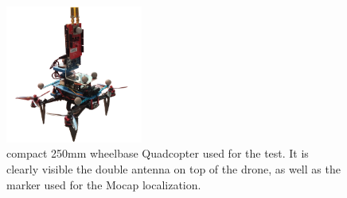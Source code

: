 \begin{figure}
    \centering
    \includegraphics[width=0.4\textwidth]{images/drone_reale_tagliato.png}
    \caption{compact 250mm wheelbase Quadcopter used for the test. It is clearly visible the double antenna on top of the drone, as well as the marker used for the Mocap localization.}
    \label{INT:fig:drone_photo}
\end{figure}


